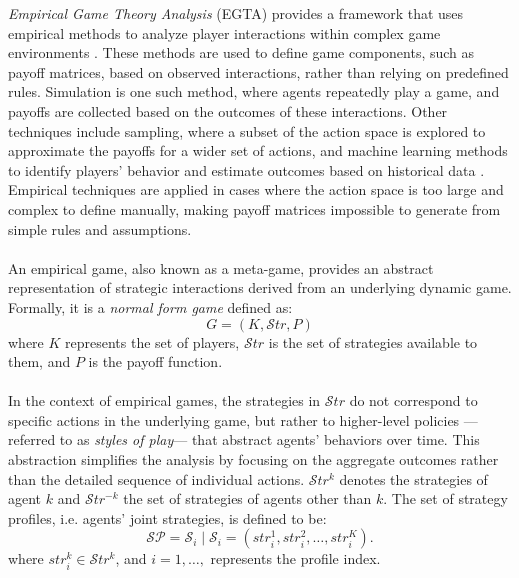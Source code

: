 \begin{flushleft}

    \emph{Empirical Game Theory Analysis} (EGTA) provides a framework that uses empirical methods to analyze player interactions within complex game environments \cite{Levet2016GameT}. These methods are used to define game components, such as payoff matrices, based on observed interactions, rather than relying on predefined rules. Simulation is one such method, where agents repeatedly play a game, and payoffs are collected based on the outcomes of these interactions. Other techniques include sampling, where a subset of the action space is explored to approximate the payoffs for a wider set of actions, and machine learning methods to identify players' behavior and estimate outcomes based on historical data \cite{wellman2024empiricalgametheoreticanalysissurvey}. Empirical techniques are applied in cases where the action space is too large and complex to define manually, making payoff matrices impossible to generate from simple rules and assumptions.\\~\\

    An empirical game, also known as a meta-game, provides an abstract representation of strategic interactions derived from an underlying dynamic game. Formally, it is a \emph{normal form game} defined as:
    \begin{equation}
        G = (K, \mathcal{S}tr, P)
        \label{eq:nfg}
    \end{equation}        
    where $K$ represents the set of players, $\mathcal{S}tr$ is the set of strategies available to them, and $P$ is the payoff function.\\~\\
    
    In the context of empirical games, the strategies in $\mathcal{S}tr$ do not correspond to specific actions in the underlying game, but rather to higher-level policies —referred to as \emph{styles of play}— that abstract agents' behaviors over time. This abstraction simplifies the analysis by focusing on the aggregate outcomes rather than the detailed sequence of individual actions. $\mathcal{S}tr^k$ denotes the strategies of agent $k$ and $\mathcal{S}tr^{-k}$ the set of strategies of agents other than $k$. The set of strategy profiles, i.e. agents' joint strategies, is defined to be:
    \begin{equation}
        \mathcal{SP} = \mathcal{S}_i \mid \mathcal{S}_i = (str_i^1, str_i^2, \dots, str_i^K).
        \label{eq:strategy_profiles}
    \end{equation}
    where $str_i^k \in \mathcal{S}tr^k$, and $i = 1, \dots,$ represents the profile index.\\~\\
    

\end{flushleft}
